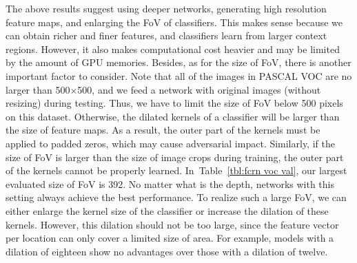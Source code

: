 \documentclass{article}
\begin{document}
The above results suggest
using deeper networks, generating high resolution feature maps, and enlarging the FoV of classifiers.
This  makes sense because we can obtain richer and finer features, and  classifiers learn from larger context regions.
However, it also makes computational cost heavier and may be limited by the amount of GPU memories.
Besides, as for the size of FoV, there is another important factor to consider.
Note that all of the images in PASCAL VOC are no larger than 500$\times$500, and we feed a network with original images (without resizing) during testing.
Thus, we have to limit the size of FoV below 500 pixels on this dataset.
Otherwise, the dilated kernels of a classifier will be larger than the size of feature maps.
As a result, the outer part of the kernels must be applied to padded zeros, which may cause adversarial impact.
Similarly, if the size of FoV is larger than the size of image crops during training, the outer part of the kernels cannot be properly learned.
In~Table~\ref{tbl:fcrn voc val}, our largest evaluated size of FoV is 392.
No matter what is the depth, networks with this setting always achieve the best performance.
To realize such a large FoV, we can either enlarge the kernel size of the classifier or increase the dilation of these kernels.
However, this dilation should not be too large, since the feature vector per location can only cover a limited size of area.
For example, models with a dilation of eighteen show no advantages over those with a dilation of twelve.
\end{document}
